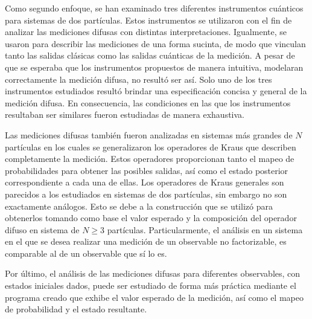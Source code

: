 
Como segundo enfoque, se han examinado tres diferentes instrumentos cuánticos
para sistemas de dos partículas. Estos instrumentos se utilizaron con el fin de
analizar las mediciones difusas con distintas interpretaciones.  Igualmente, se
usaron para describir las mediciones de una forma sucinta, de modo que vinculan
tanto las salidas clásicas como las salidas cuánticas de la medición. A pesar
de que se esperaba que los instrumentos propuestos de manera intuitiva,
modelaran correctamente la medición difusa, no resultó ser así. Solo uno de los
tres instrumentos estudiados resultó brindar una especificación concisa y
general de la medición difusa. En consecuencia, las condiciones en las que los
instrumentos resultaban ser similares fueron estudiadas de manera exhaustiva. 




Las mediciones difusas también fueron analizadas en sistemas más grandes de $N$
partículas en los cuales se generalizaron los operadores de Kraus que describen
completamente la medición. Estos operadores proporcionan tanto el mapeo de
probabilidades para obtener las posibles salidas, así como el estado posterior
correspondiente a cada una de ellas. Los operadores de Kraus generales son
parecidos a los estudiados en sistemas de dos partículas, sin embargo no son
exactamente análogos. Esto se debe a la construcción que se utilizó para
obtenerlos tomando como base el valor esperado y la composición del operador
difuso en sistema de $N\geq3$ partículas. %
Particularmente, el análisis en un sistema en el que se desea realizar una
medición de un observable no factorizable, es comparable al de un observable
que sí lo es.


Por último, el análisis de las mediciones difusas para diferentes observables,
con estados iniciales dados, puede ser estudiado de forma más práctica mediante
el programa creado que exhibe el valor esperado de la medición, así como el
mapeo de probabilidad y el estado resultante.

